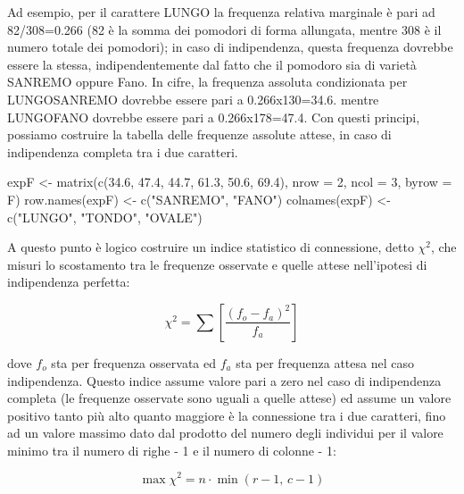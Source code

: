 \documentclass[a4paper,12pt,oneside]{book}
\newenvironment{Shaded}{}{}
\newcommand{\KeywordTok}[1]{#1}
\newcommand{\DataTypeTok}[1]{#1}
\newcommand{\DecValTok}[1]{#1}
\newcommand{\FloatTok}[1]{#1}
\newcommand{\StringTok}[1]{#1}
\newcommand{\NormalTok}[1]{#1}
\begin{document}
Ad esempio, per il carattere LUNGO la frequenza relativa marginale è pari ad 82/308=0.266 (82 è la somma dei pomodori di forma allungata, mentre 308 è il numero totale dei pomodori); in caso di indipendenza, questa frequenza dovrebbe essere la stessa, indipendentemente dal fatto che il pomodoro sia di varietà SANREMO oppure Fano. In cifre, la frequenza assoluta condizionata per LUNGO\textbar{}SANREMO dovrebbe essere pari a 0.266x130=34.6. mentre LUNGO\textbar{}FANO dovrebbe essere pari a 0.266x178=47.4. Con questi principi, possiamo costruire la tabella delle frequenze assolute attese, in caso di indipendenza completa tra i due caratteri.

\begin{Shaded}
\begin{Highlighting}[]
\NormalTok{expF <-}\StringTok{ }\KeywordTok{matrix}\NormalTok{(}\KeywordTok{c}\NormalTok{(}\FloatTok{34.6}\NormalTok{, }\FloatTok{47.4}\NormalTok{, }\FloatTok{44.7}\NormalTok{, }\FloatTok{61.3}\NormalTok{, }\FloatTok{50.6}\NormalTok{, }\FloatTok{69.4}\NormalTok{), }
                 \DataTypeTok{nrow =} \DecValTok{2}\NormalTok{, }\DataTypeTok{ncol =} \DecValTok{3}\NormalTok{,}
                 \DataTypeTok{byrow =}\NormalTok{ F)}
\KeywordTok{row.names}\NormalTok{(expF) <-}\StringTok{ }\KeywordTok{c}\NormalTok{(}\StringTok{"SANREMO"}\NormalTok{, }\StringTok{"FANO"}\NormalTok{)}
\KeywordTok{colnames}\NormalTok{(expF) <-}\StringTok{ }\KeywordTok{c}\NormalTok{(}\StringTok{"LUNGO"}\NormalTok{, }\StringTok{"TONDO"}\NormalTok{, }\StringTok{"OVALE"}\NormalTok{)}
\end{Highlighting}
\end{Shaded}

A questo punto è logico costruire un indice statistico di connessione, detto \(\chi^2\), che misuri lo scostamento tra le frequenze osservate e quelle attese nell'ipotesi di indipendenza perfetta:

\[\chi ^2  = \sum \left[ \frac{\left( {f_o  - f_a } \right)^2 }{f_a } \right]\]

dove \(f_o\) sta per frequenza osservata ed \(f_a\) sta per frequenza attesa nel caso indipendenza. Questo indice assume valore pari a zero nel caso di indipendenza completa (le frequenze osservate sono uguali a quelle attese) ed assume un valore positivo tanto più alto quanto maggiore è la connessione tra i due caratteri, fino ad un valore massimo dato dal prodotto del numero degli individui per il valore minimo tra il numero di righe - 1 e il numero di colonne - 1:

\[\max \chi ^2  = n \cdot \min (r - 1,\,c - 1)\]
\end{document}
